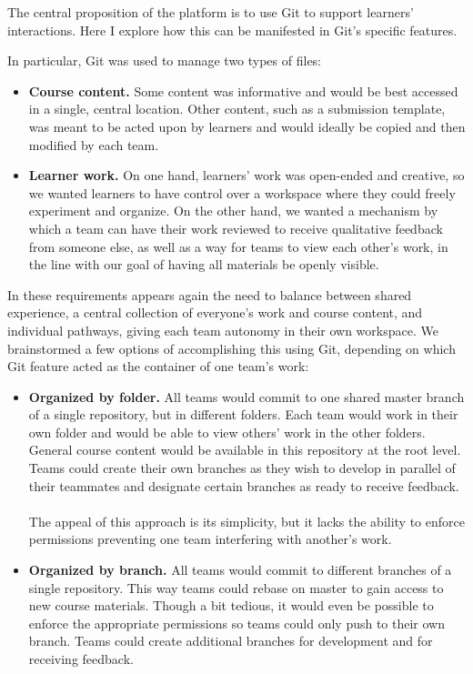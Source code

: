 \documentclass[12pt,twoside]{mitthesis}
\newcommand{\review}[1]{{\color{mygreen} #1}}
\begin{document}
\review{The central proposition of the platform is to use Git to support learners' interactions. Here I explore how this can be manifested in Git's specific features.

In particular, Git was used to manage two types of files:
\begin{itemize}
 	\item \textbf{Course content.} Some content was informative and would be best accessed in a single, central location. Other content, such as a submission template, was meant to be acted upon by learners and would ideally be copied and then modified by each team.
 	\item \textbf{Learner work.} On one hand, learners' work was open-ended and creative, so we wanted learners to have control over a workspace where they could freely experiment and organize. On the other hand, we wanted a mechanism by which a team can have their work reviewed to receive qualitative feedback from someone else, as well as a way for teams to view each other's work, in the line with our goal of having all materials be openly visible.
\end{itemize} 
In these requirements appears again the need to balance between shared experience, a central collection of everyone's work and course content, and individual pathways, giving each team autonomy in their own workspace. We brainstormed a few options of accomplishing this using Git, depending on which Git feature acted as the container of one team's work:
\begin{itemize}
\item \textbf{Organized by folder.} All teams would commit to one shared master branch of a single repository, but in different folders. Each team would work in their own folder and would be able to view others' work in the other folders. General course content would be available in this repository at the root level. Teams could create their own branches as they wish to develop in parallel of their teammates and designate certain branches as ready to receive feedback.\\ \\
The appeal of this approach is its simplicity, but it lacks the ability to enforce permissions preventing one team interfering with another's work.
\item \textbf{Organized by branch.} All teams would commit to different branches of a single repository. This way teams could rebase on master to gain access to new course materials. Though a bit tedious, it would even be possible to enforce the appropriate permissions so teams could only push to their own branch. Teams could create additional branches for development and for receiving feedback.\\ \\

\end{itemize}}
\end{document}
